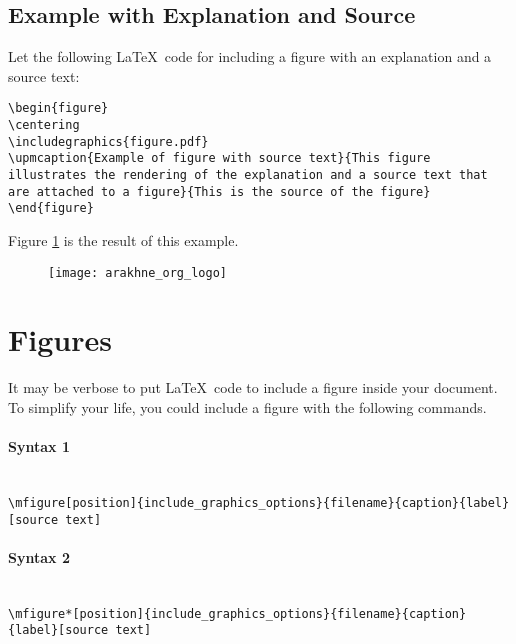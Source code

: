 \documentclass[book,taskpackage,specpackage,codepackage]{upmethodology-document}
\begin{document}
\subsection{Example with Explanation and Source}

Let the following \LaTeX\ code for including a figure with an explanation and a source text:

\texttt{{\textbackslash}begin\{figure\}} \\
\texttt{{\textbackslash}centering} \\
\texttt{{\textbackslash}includegraphics\{figure.pdf\}} \\
\texttt{{\textbackslash}upmcaption\{Example of figure with source text\}\{This figure illustrates the rendering of the explanation and a source text that are attached to a figure\}\{This is the source of the figure\}} \\
\texttt{{\textbackslash}end\{figure\}}

Figure \ref{example:upmcaption3} is the result of this example.

\begin{figure}
	\centering
	\texttt{[image: arakhne\_org\_logo]}
	\label{example:upmcaption3}
\end{figure}

\section{Figures}

It may be verbose to put \LaTeX\ code to include a figure inside your document. To simplify your life, you could include a figure with the following commands.

\paragraph{Syntax 1} \mbox{}\\
\texttt{{\textbackslash}mfigure[position]\{include\_graphics\_options\}\{filename\}\{caption\}\{label\}[source text]}

\paragraph{Syntax 2} \mbox{}\\
\texttt{{\textbackslash}mfigure*[position]\{include\_graphics\_options\}\{filename\}\{caption\}\{label\}[source text]}
\end{document}
